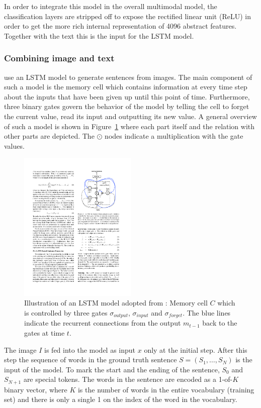 In order to integrate this model in the overall multimodal model, the classification layers are stripped off to expose the rectified linear unit (ReLU) in order to get the more rich internal representation of 4096 abstract features. Together with the text this is the input for the LSTM model.

\subsubsection{Combining image and text}
\citeauthor{vinyals2014show} use an LSTM model to generate sentences from images. The main component of such a model is the memory cell which contains information at every time step about the inputs that have been given up until this point of time. Furthermore, three binary gates govern the behavior of the model by telling the cell to forget the current value, read its input and outputting its new value. A general overview of such a model is shown in Figure~\ref{fig:lstm} where each part itself and the relation with other parts are depicted. The $\odot$ nodes indicate a multiplication with the gate values.

\begin{figure}[h!]
\centering
	\includegraphics[width=0.5\textwidth]{images/LSTM}
	\caption{Illustration of an LSTM model adopted from \cite{vinyals2014show}: Memory cell $C$ which is controlled by three gates $\sigma_{output}$, $\sigma_{input}$ and $\sigma_{forget}$. The blue lines indicate the recurrent connections from the output $m_{t-1}$ back to the gates at time $t$.}
	\label{fig:lstm}
\end{figure}

The image $I$ is fed into the model as input $x$ only at the initial step. After this step the sequence of words in the ground truth sentence $S = (S_1,\ldots,S_N)$ is the input of the model. To mark the start and the ending of the sentence, $S_0$ and $S_{N+1}$ are special tokens. The words in the sentence are encoded as a 1-of-$K$ binary vector, where $K$ is the number of words in the entire vocabulary (training set) and there is only a single 1 on the index of the word in the vocabulary.


